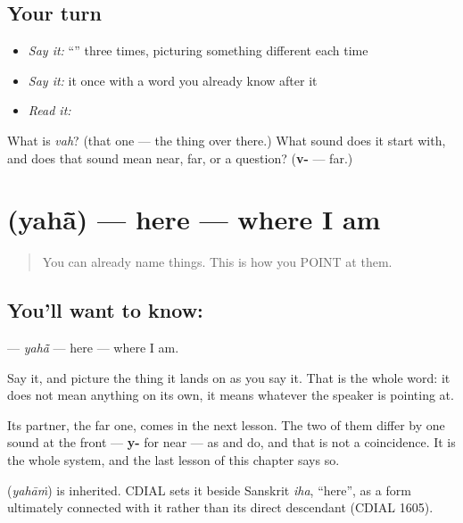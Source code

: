 \subsection*{Your turn}
\begin{itemize}
\raggedright
  \item \emph{Say it:} \textquotedblleft{}\textquotedblright{} three times, picturing something different each time
  \item \emph{Say it:} it once with a word you already know after it
  \item \emph{Read it:} \textbf{}
\end{itemize}

\begin{tcolorbox}[breakable,colback=teal!4,colframe=teal!35!black,title={Before you move on}]
What is \emph{vah}? (that one — the thing over there.) What sound does it start with, and does that sound mean near, far, or a question? (\textbf{v-} — far.)
\end{tcolorbox}
\section[\texorpdfstring{\hi{यहाँ} (yahā̃)}{यहाँ (yahā̃)}]{ (yahā̃) — here — where I am}

\label{lesson:HI-C40-here}



\begin{quote}
You can already name things. This is how you POINT at them.
\end{quote}

\subsection*{You'll want to know: }
\textbf{} — \emph{yahā̃} — here — where I am.

Say it, and picture the thing it lands on as you say it. That is the whole word: it does not mean anything on its own, it means whatever the speaker is pointing at.

Its partner, the far one, comes in the next lesson. The two of them differ by one sound at the front — \textbf{y-} for near — as \textbf{} and \textbf{} do, and that is not a coincidence. It is the whole system, and the last lesson of this chapter says so.

\begin{cousinweb}
\textbf{} (\emph{yahāṁ}) is inherited. CDIAL sets it beside Sanskrit \emph{iha}, \textquotedblleft{}here\textquotedblright{}, as a form ultimately connected with it rather than its direct descendant (CDIAL 1605).
\end{cousinweb}


